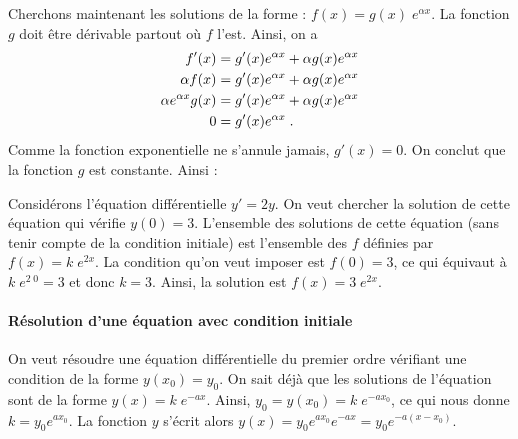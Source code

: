                   Cherchons maintenant les solutions de la forme : $ f(x) = g(x) \; e^{\alpha x}$.
	                  La fonction $g$ doit \^etre d\'erivable partout o\`u $f$ l'est.
                  Ainsi, on a 
                  \begin{align*}
                        f'(x) & = g'(x) e^{\alpha x } + \alpha g(x) e^{\alpha x} \\
                        \mampiditratext{et comme $f'(x) = \alpha f(x)$}
                        \alpha f(x) & = g'(x) e^{\alpha x } + \alpha g(x) e^{\alpha x} \\
                        \mampiditratext{de plus, $f(x) = g(x) e^{\alpha x}$, donc }
                        \alpha e^{\alpha x} g(x) & = g'(x) e^{\alpha x } + \alpha g(x) e^{\alpha x} \\
                        \mampiditratext{et il suit que }
                        0 & = g'(x) e^{\alpha x } \;.
                  \end{align*}
	                  Comme la fonction exponentielle ne s'annule jamais, $g'(x) = 0$.
	                  On conclut que la fonction $g$ est constante.
	                  Ainsi :
	                  \par\smallskip\noindent
                  \begin{exe}
                  Consid\'erons l'\'equation diff\'erentielle $y' =  2 y$.
                  On veut chercher la solution de cette \'equation qui v\'erifie $y(0) = 3$.
                  L'ensemble des solutions de cette \'equation (sans tenir compte de la condition initiale)
                  est l'ensemble des $f$ d\'efinies par $f(x) = k \; e^{2 x}$.
                  La condition qu'on veut imposer est $f(0) = 3$, ce qui \'equivaut \`a $k \; e^{2 \; 0} = 3$ et donc $k = 3$.
                  Ainsi, la solution est $f(x) = 3 \; e^{2 x}$.
                  \end{exe}
            \paragraph{R\'esolution d'une \'equation avec condition initiale}
                  On veut r\'esoudre une \'equation diff\'erentielle du premier ordre 
                  v\'erifiant une condition de la forme $y(x_0) = y_0$.
                  On sait d\'ej\`a que les solutions de l'\'equation sont de la forme $y(x) = k \; e^{-a x}$.
                  Ainsi, $y_0 = y(x_0) = k \; e^{-a x_0}$, ce qui nous donne $k = y_0 e^{a x_0}$.
                  La fonction $y$ s'\'ecrit alors
                  $y(x) = y_0 e^{a x_0} e^{-a x} = y_0 e^{-a(x - x_0)}$.
                  
